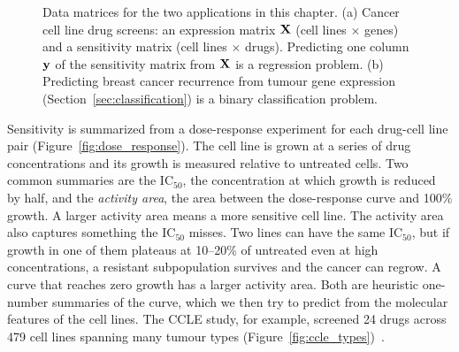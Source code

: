 \begin{figure}[t]
  \centering
  \caption{Data matrices for the two applications in this chapter. (a) Cancer cell line drug screens: an expression matrix $\mathbf{X}$ (cell lines $\times$ genes) and a sensitivity matrix (cell lines $\times$ drugs). Predicting one column $\mathbf{y}$ of the sensitivity matrix from $\mathbf{X}$ is a regression problem. (b) Predicting breast cancer recurrence from tumour gene expression (Section~\ref{sec:classification}) is a binary classification problem.}
  \label{fig:data_matrices}
\end{figure}

Sensitivity is summarized from a dose-response experiment for each drug-cell line pair (Figure~\ref{fig:dose_response}). The cell line is grown at a series of drug concentrations and its growth is measured relative to untreated cells. Two common summaries are the IC$_{50}$, the concentration at which growth is reduced by half, and the \emph{activity area}, the area between the dose-response curve and 100\% growth. A larger activity area means a more sensitive cell line. The activity area also captures something the IC$_{50}$ misses. Two lines can have the same IC$_{50}$, but if growth in one of them plateaus at 10--20\% of untreated even at high concentrations, a resistant subpopulation survives and the cancer can regrow. A curve that reaches zero growth has a larger activity area. Both are heuristic one-number summaries of the curve, which we then try to predict from the molecular features of the cell lines. The CCLE study, for example, screened 24 drugs across 479 cell lines spanning many tumour types (Figure~\ref{fig:ccle_types})~\citep{barretina2012}.

